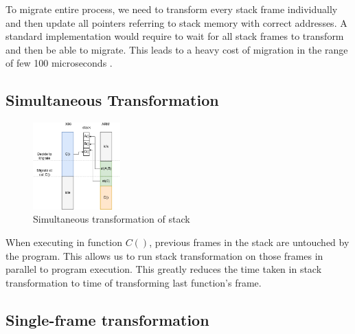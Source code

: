\documentclass[a4paper]{article}
\begin{document}
To migrate entire process, we need to transform every stack frame individually and then update all pointers referring to stack memory with correct addresses. A standard implementation would require to wait for all stack frames to transform and then be able to migrate. This leads to a heavy cost of migration in the range of few 100 microseconds \cite{execution-migration}.

\subsection{Simultaneous Transformation}

\begin{figure}[H]
\centering
\includegraphics[width=0.3\textwidth]{simul_trans}
\caption{\label{fig:simul_trans}Simultaneous transformation of stack}
\end{figure}

When executing in function $C()$, previous frames in the stack are untouched by the program. This allows us to run stack transformation on those frames in parallel to program execution. This greatly reduces the time taken in stack transformation to time of transforming last function's frame.

\subsection{Single-frame transformation}
\end{document}
